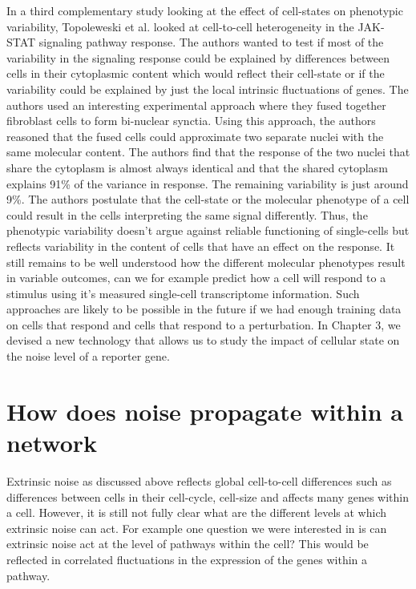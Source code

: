 In a third complementary study looking at the effect of cell-states on phenotypic variability, Topoleweski et al. \cite{topolewski2022ssb} looked at cell-to-cell heterogeneity in the JAK-STAT signaling pathway response. The authors wanted to test if most of the variability in the signaling response could be explained by differences between cells in their cytoplasmic content which would reflect their cell-state or if the variability could be explained by just the local intrinsic fluctuations of genes. The authors used an interesting experimental approach where they fused together fibroblast cells to form bi-nuclear synctia. Using this approach, the authors reasoned that the fused cells could approximate two separate nuclei with the same molecular content. The authors find that the response of the two nuclei that share the cytoplasm is almost always identical and that the shared cytoplasm explains 91\% of the variance in response. The remaining variability is just around 9\%. The authors postulate that the cell-state or the molecular phenotype of a cell could result in the cells interpreting the same signal differently. Thus, the phenotypic variability doesn't argue against reliable functioning of single-cells but reflects variability in the content of cells that have an effect on the response. It still remains to be well understood how the different molecular phenotypes result in variable outcomes, can we for example predict how a cell will respond to a stimulus using it's measured single-cell transcriptome information. Such approaches are likely to be possible in the future if we had enough training data on cells that respond and cells that respond to a perturbation. In Chapter 3, we devised a new technology that allows us to study the impact of cellular state on the noise level of a reporter gene.

\section{How does noise propagate within a network}

Extrinsic noise as discussed above reflects global cell-to-cell differences such as differences between cells in their cell-cycle, cell-size and affects many genes within a cell. However, it is still not fully clear what are the different levels at which extrinsic noise can act. For example one question we were interested in is can extrinsic noise act at the level of pathways within the cell? This would be reflected in correlated fluctuations in the expression of the genes within a pathway.

